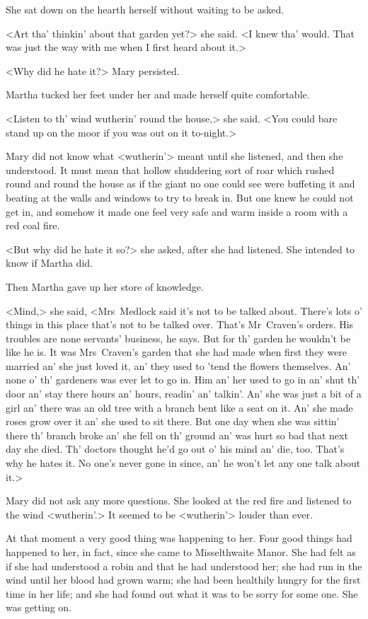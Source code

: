 She sat down on the hearth herself without waiting to be asked.

<Art tha' thinkin' about that garden yet?> she said. <I knew tha' would. That was just the way with me when I first heard about it.>

<Why did he hate it?> Mary persisted.

Martha tucked her feet under her and made herself quite comfortable.

<Listen to th' wind wutherin' round the house,> she said. <You could bare stand up on the moor if you was out on it to-night.>

Mary did not know what <wutherin'> meant until she listened, and then she understood. It must mean that hollow shuddering sort of roar which rushed round and round the house as if the giant no one could see were buffeting it and beating at the walls and windows to try to break in. But one knew he could not get in, and somehow it made one feel very safe and warm inside a room with a red coal fire.

<But why did he hate it so?> she asked, after she had listened. She intended to know if Martha did.

Then Martha gave up her store of knowledge.

<Mind,> she said, <Mrs~Medlock said it's not to be talked about. There's lots o' things in this place that's not to be talked over. That's Mr~Craven's orders. His troubles are none servants' business, he says. But for th' garden he wouldn't be like he is. It was Mrs~Craven's garden that she had made when first they were married an' she just loved it, an' they used to 'tend the flowers themselves. An' none o' th' gardeners was ever let to go in. Him an' her used to go in an' shut th' door an' stay there hours an' hours, readin' an' talkin'. An' she was just a bit of a girl an' there was an old tree with a branch bent like a seat on it. An' she made roses grow over it an' she used to sit there. But one day when she was sittin' there th' branch broke an' she fell on th' ground an' was hurt so bad that next day she died. Th' doctors thought he'd go out o' his mind an' die, too. That's why he hates it. No one's never gone in since, an' he won't let any one talk about it.>

Mary did not ask any more questions. She looked at the red fire and listened to the wind <wutherin'.> It seemed to be <wutherin'> louder than ever.

At that moment a very good thing was happening to her. Four good things had happened to her, in fact, since she came to Misselthwaite Manor. She had felt as if she had understood a robin and that he had understood her; she had run in the wind until her blood had grown warm; she had been healthily hungry for the first time in her life; and she had found out what it was to be sorry for some one. She was getting on.

